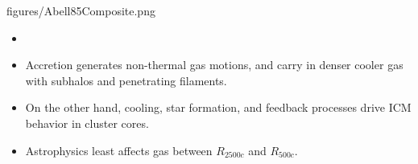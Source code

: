 \documentclass[landscape,a0paper,fontscale=0.285]{baposter} %
\begin{document}
\begin{poster}
{\begin{multicols}{2}
\begin{center}
\begin{tikzonimage}[width=\columnwidth, trim=0 120 500 600, clip]{figures/Abell85Composite.png}
    \end{tikzonimage}
\end{center}
\begin{center}
\begin{itemize}
\alignleft
\item[]
\item {\Large Accretion generates non-thermal gas motions, and carry
  in denser cooler gas with subhalos and penetrating filaments.}
\item {\Large On the other hand, cooling, star formation, and feedback
  processes drive ICM behavior in cluster cores.}
\item {\Large Astrophysics least affects gas between $R_{2500c}$ and $R_{500c}$.}

\end{itemize}
\end{center}
\end{multicols}
}




\end{poster}
\end{document}
